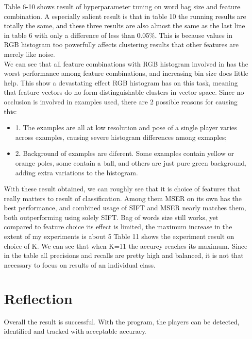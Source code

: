 \documentclass{article}
\begin{document}
Table 6-10 shows result of hyperparameter tuning on word bag size and feature combination.
A especially salient result is that in table 10 the running results are totally the same, and these three results are also almost the same as the last line in table 6 with only a difference of less than 0.05\%. This is because values in RGB histogram too powerfully affects clustering results that other features are merely like noise.\\
We can see that all feature combinations with RGB histogram involved in has the worst performance among feature combinations, and increasing bin size does little help. This show a devastating effect RGB histogram has on this task, meaning that feature vectors do no form distinguishable clusters in vector space. Since no occlusion is involved in examples used, there are 2 possible reasons for causing this:
\begin{itemize}
\item 1. The examples are all at low resolution and pose of a single player varies across examples, causing severe histogram differences among exmaples;
\item 2. Background of examples are diferent. Some examples contain yellow or orange poles, some contain a ball, and others are just pure green background, adding extra variations to the histogram.
\end{itemize}
With these result obtained, we can roughly see that it is choice of features that really matters to result of classification. Among them MSER on its own has the best performance, and combined usage of SIFT and MSER nearly matches them, both outperforming using solely SIFT.
Bag of words size still works, yet compared to feature choice its effect is limited, the maximum increase in the extent of my experiments is about 5%
Table 11 shows the experiment result on choice of K. We can see that when K=11 the accurcy reaches its maximum. Since in the table all precisions and recalls are pretty high and balanced, it is not that necessary to focus on results of an individual class.
\newpage

\section{Reflection}
Overall the result is successful. With the program, the players can be detected, identified and tracked with acceptable accuracy.
\end{document}
